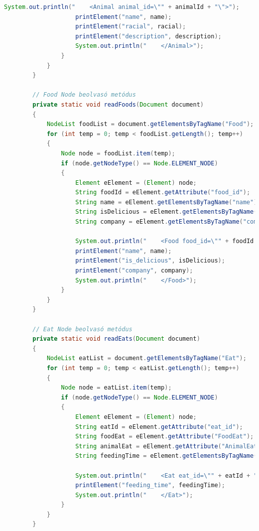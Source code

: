 \documentclass[12pt]{report}
\begin{document}
\begin{lstlisting}[caption={DOMReadKLNSPG.java} olvasó program, language=Java]
					System.out.println("    <Animal animal_id=\"" + animalId + "\">");
					printElement("name", name);
					printElement("racial", racial);
					printElement("description", description);
					System.out.println("    </Animal>");
				}
			}
		}
		
		// Food Node beolvasó metódus
		private static void readFoods(Document document) 
		{
			NodeList foodList = document.getElementsByTagName("Food");
			for (int temp = 0; temp < foodList.getLength(); temp++) 
			{
				Node node = foodList.item(temp);
				if (node.getNodeType() == Node.ELEMENT_NODE) 
				{
					Element eElement = (Element) node;
					String foodId = eElement.getAttribute("food_id");
					String name = eElement.getElementsByTagName("name").item(0).getTextContent();
					String isDelicious = eElement.getElementsByTagName("is_delicious").item(0).getTextContent();
					String company = eElement.getElementsByTagName("company").item(0).getTextContent();
					
					System.out.println("    <Food food_id=\"" + foodId + "\">");
					printElement("name", name);
					printElement("is_delicious", isDelicious);
					printElement("company", company);
					System.out.println("    </Food>");
				}
			}
		}
		
		// Eat Node beolvasó metódus
		private static void readEats(Document document) 
		{
			NodeList eatList = document.getElementsByTagName("Eat");
			for (int temp = 0; temp < eatList.getLength(); temp++) 
			{
				Node node = eatList.item(temp);
				if (node.getNodeType() == Node.ELEMENT_NODE) 
				{
					Element eElement = (Element) node;
					String eatId = eElement.getAttribute("eat_id");
					String foodEat = eElement.getAttribute("FoodEat");
					String animalEat = eElement.getAttribute("AnimalEat");
					String feedingTime = eElement.getElementsByTagName("feeding_time").item(0).getTextContent();
					
					System.out.println("    <Eat eat_id=\"" + eatId + "\" FoodEat=\"" + foodEat + "\" AnimalEat=\"" + animalEat + "\">");
					printElement("feeding_time", feedingTime);
					System.out.println("    </Eat>");
				}
			}
		}
		

\end{lstlisting}
\end{document}
